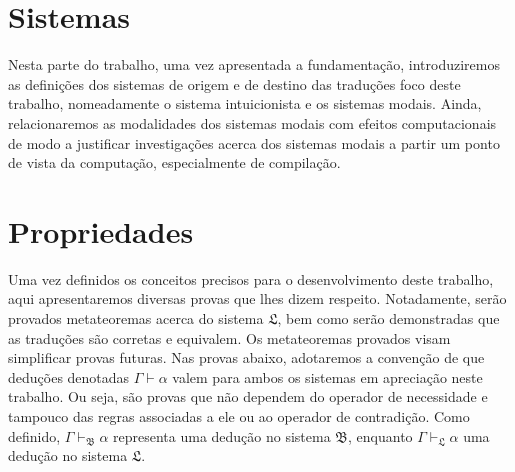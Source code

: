     \tableofcontents

    
    
    

    \chapter{Sistemas}

        Nesta parte do trabalho, uma vez apresentada a fundamentação, introduziremos as definições dos sistemas de origem e de destino das traduções foco deste trabalho, nomeadamente o sistema intuicionista e os sistemas modais.
        Ainda, relacionaremos as modalidades dos sistemas modais com efeitos computacionais de modo a justificar investigações acerca dos sistemas modais a partir um ponto de vista da computação, especialmente de compilação.

        
        
        

    \chapter{Propriedades}
        Uma vez definidos os conceitos precisos para o desenvolvimento deste trabalho, aqui apresentaremos diversas provas que lhes dizem respeito.
        Notadamente, serão provados metateoremas acerca do sistema $\mathfrak{L}$, bem como serão demonstradas que as traduções são corretas e equivalem.
        Os metateoremas provados visam simplificar provas futuras.
        Nas provas abaixo, adotaremos a convenção de que deduções denotadas $\Gamma\vdash\alpha$ valem para ambos os sistemas em apreciação neste trabalho.
        Ou seja, são provas que não dependem do operador de necessidade e tampouco das regras associadas a ele ou ao operador de contradição.
        Como definido, $\Gamma\vdash_\mathfrak{B}\alpha$ representa uma dedução no sistema $\mathfrak{B}$, enquanto $\Gamma\vdash_\mathfrak{L}\alpha$ uma dedução no sistema $\mathfrak{L}$.

        
        
        
        
        

    
    

